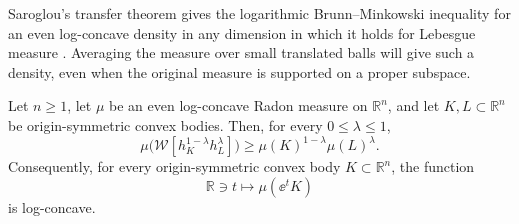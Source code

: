 Saroglou's transfer theorem gives the logarithmic Brunn--Minkowski inequality for an even log-concave density in any dimension in which it holds for Lebesgue measure \cite[Theorem~3.1]{Saroglou2016}. Averaging the measure over small translated balls will give such a density, even when the original measure is supported on a proper subspace.

\begin{corollary}
\label{cor:measure}
Let $n\ge1$, let $\mu$ be an even log-concave Radon measure on $\mathbb{R}^n$, and let $K,L\subset\mathbb{R}^n$ be origin-symmetric convex bodies. Then, for every $0\le\lambda\le1$,
\begin{equation}\label{eq:measure-logbm}
 \mu\bigl(\mathcal{W}[h_K^{1-\lambda}h_L^\lambda]\bigr)
 \ge \mu(K)^{1-\lambda}\mu(L)^\lambda.
\end{equation}
Consequently, for every origin-symmetric convex body $K\subset\mathbb{R}^n$, the function
\begin{equation}\label{eq:b-function}
 \mathbb{R}\ni t\longmapsto \mu(\ee^tK)
\end{equation}
is log-concave.
\end{corollary}

